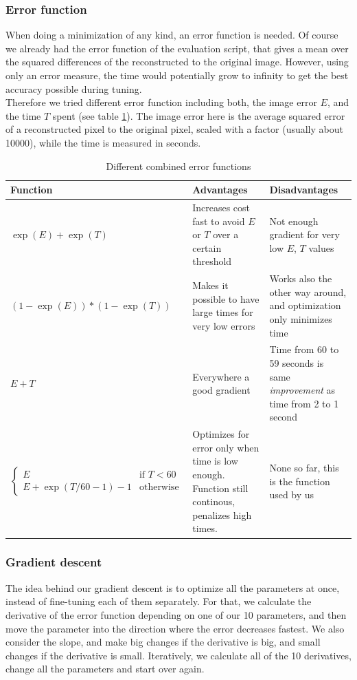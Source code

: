 \documentclass[10pt,conference,compsocconf]{IEEEtran}
\begin{document}
\subsubsection{Error function}
When doing a minimization of any kind, an error function is needed. Of course we already had the error function of the evaluation script, that gives a mean over the squared differences of the reconstructed to the original image. However, using only an error measure, the time would potentially grow to infinity to get the best accuracy possible during tuning.\\
Therefore we tried different error function including both, the image error $E$, and the time $T$ spent (see table \ref{error_function_table}). The image error here is the average squared error of a reconstructed pixel to the original pixel, scaled with a factor (usually about 10000), while the time is measured in seconds.

\begin{table}
  \centering
  \begin{tabular}{|l|p{5cm}|p{5cm}|}
    \hline
    Function&Advantages&Disadvantages\\
    \hline
    $\exp(E)+\exp(T)$ & Increases cost fast to avoid $E$ or $T$ over a certain threshold & Not enough gradient for very low $E$, $T$ values\\
    \hline
    $(1-\exp(E))*(1-\exp(T))$ & Makes it possible to have large times for very low errors & Works also the other way around, and optimization only minimizes time\\
    \hline
    $E + T$ & Everywhere a good gradient & Time from 60 to 59 seconds is same \textit{improvement} as time from 2 to 1 second\\
    \hline
    $\begin{cases}
  E  & \text{if }T<60\\
  E+\exp(T/60 - 1) - 1 & \text{otherwise}
\end{cases}$ & Optimizes for error only when time is low enough. Function still continous, penalizes high times. & None so far, this is the function used by us\\
    \hline
  \end{tabular}
  \caption{Different combined error functions}
  \label{error_function_table}
\end{table}


\subsubsection{Gradient descent}
The idea behind our gradient descent is to optimize all the parameters at once, instead of fine-tuning each of them separately. For that, we
calculate the derivative of the error function depending on one of our 10 parameters, and then move the parameter into the direction where the
error decreases fastest. We also consider the slope, and make big changes if the derivative is big, and small changes if the derivative is small.
Iteratively, we calculate all of the 10 derivatives, change all the parameters and start over again.
\end{document}
